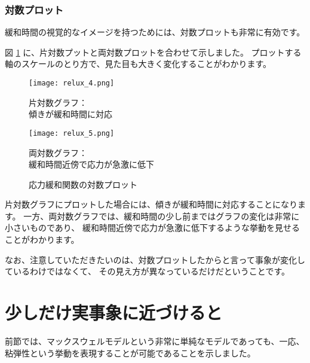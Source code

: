 \documentclass[uplatex,dvipdfmx,a4paper,11pt]{jsarticle}
\begin{document}
\subsubsection{対数プロット}
緩和時間の視覚的なイメージを持つためには、対数プロットも非常に有効です。

図 \ref{fig:log_plot_relux} に、片対数プットと両対数プロットを合わせて示しました。
プロットする軸のスケールのとり方で、見た目も大きく変化することがわかります。
\begin{figure}[htb]
	\begin{center}
		\begin{minipage}{0.45\textwidth}
			\begin{center}
				\texttt{[image: relux\_4.png]}

				片対数グラフ：\\傾きが緩和時間に対応
			\end{center}
		\end{minipage}
		\begin{minipage}{0.45\textwidth}
			\begin{center}
				\texttt{[image: relux\_5.png]}

				両対数グラフ：\\緩和時間近傍で応力が急激に低下
			\end{center}
		\end{minipage}
		\caption{応力緩和関数の対数プロット}
		\label{fig:log_plot_relux}
	\end{center}
\end{figure}

片対数グラフにプロットした場合には、傾きが緩和時間に対応することになります。
一方、両対数グラフでは、緩和時間の少し前まではグラフの変化は非常に小さいものであり、
緩和時間近傍で応力が急激に低下するような挙動を見せることがわかります。

なお、注意していただきたいのは、対数プロットしたからと言って事象が変化しているわけではなくて、
その見え方が異なっているだけだということです。

\section{少しだけ実事象に近づけると}

前節では、マックスウェルモデルという非常に単純なモデルであっても、一応、粘弾性という挙動を表現することが可能であることを示しました。
\end{document}
